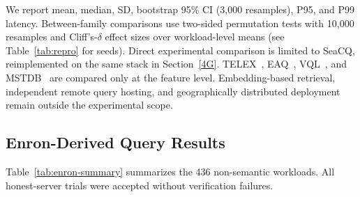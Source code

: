 \documentclass[journal]{IEEEtran}
\theoremstyle{tight}
\theoremstyle{remark}
\theoremstyle{plain}
\begin{document}
We report mean, median, SD, bootstrap 95\% CI (3{,}000 resamples), P95, and P99 latency. Between-family comparisons use two-sided permutation tests with 10{,}000 resamples and Cliff's-\(\delta\) effect sizes over workload-level means (see Table~\ref{tab:repro} for seeds). Direct experimental comparison is limited to SeaCQ, reimplemented on the same stack in Section~\ref{4G}. TELEX~\cite{WuHaotian}, EAQ~\cite{Yin}, VQL~\cite{WuHaotianPeng}, and MSTDB~\cite{Zhou} are compared only at the feature level. Embedding-based retrieval, independent remote query hosting, and geographically distributed deployment remain outside the experimental scope.

\subsection{Enron-Derived Query Results}
\label{4D}

Table~\ref{tab:enron-summary} summarizes the 436 non-semantic workloads. All honest-server trials were accepted without verification failures.
\end{document}
